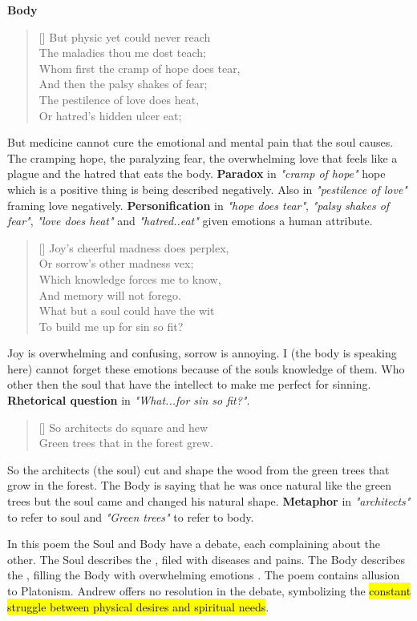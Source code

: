 \centerline{\textbf{\large{Body}}}
\begin{verse}[\versewidth]
{\fontverse
But physic yet could never reach\\
The maladies thou me dost teach;\\
Whom first the cramp of hope does tear,\\
And then the palsy shakes of fear;\\
The pestilence of love does heat,\\
Or hatred’s hidden ulcer eat; 
} 
\end{verse}

But medicine cannot cure the emotional and mental pain that the soul
causes. The cramping hope, the paralyzing fear, the overwhelming love
that feels like a plague and the hatred that eats
the body. \textbf{Paradox} in \textit{"cramp of hope"} hope which is a positive
thing is being described negatively. Also in \textit{"pestilence of love"} 
framing love negatively. \textbf{Personification} in
\textit{"hope does tear"}, \textit{"palsy shakes of fear"}, \textit{"love does heat"} and 
\textit{"hatred..eat"} given emotions a human attribute. 

\begin{verse}[\versewidth]
{\fontverse
Joy’s cheerful madness does perplex,\\
Or sorrow’s other madness vex;\\
Which knowledge forces me to know,\\
And memory will not forego.\\
What but a soul could have the wit\\
To build me up for sin so fit? 
} 
\end{verse}

Joy is overwhelming and confusing, sorrow is annoying. I 
(the body is speaking here) cannot forget these emotions because 
of the souls knowledge of them. Who other then the soul that have 
the intellect to make me perfect for sinning. \textbf{Rhetorical question}
in \textit{"What...for sin so fit?"}. 

\begin{verse}[\versewidth]
{\fontverse
So architects do square and hew\\
Green trees that in the forest grew.
} 
\end{verse}

So the architects (the soul) cut and shape the wood from
the green trees that grow in the forest. The Body is saying
that he was once natural like the green trees but the soul
came and changed his natural shape. \textbf{Metaphor} 
in \textit{"architects"} to refer to soul
and \textit{"Green trees"} to refer to body.


In this poem the Soul and Body have a debate, each complaining about the 
other. The Soul describes the , filed with diseases and
pains. The Body describes the , filling the Body
with overwhelming emotions . The poem contains allusion to Platonism.
Andrew offers no resolution in the debate, symbolizing the \hl{constant 
struggle between physical desires and spiritual needs}. 

